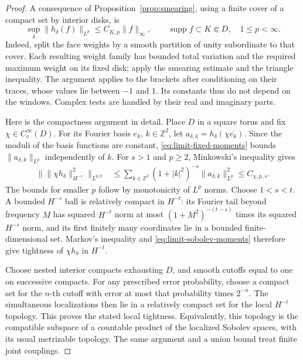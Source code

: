 \documentclass[11pt]{article}
\newcommand{\Z}{\mathbb Z}
\DeclareMathOperator{\supp}{supp}
\theoremstyle{definition}
\theoremstyle{remark}
\numberwithin{equation}{section}
\begin{document}
\begin{proof}
A consequence of Proposition~\ref{prop:smearing}, using a finite
cover of a compact set by interior disks, is
\begin{equation}
 \sup_\delta\|h_\delta(f)\|_{L^p}
 \le C_{K,p}\|f\|_\infty,\qquad
 \supp f\subset K\Subset D,\quad 1\le p<\infty.
 \label{eq:limit-fixed-moments}
\end{equation}
Indeed, split the face weights by a smooth partition of unity
subordinate to that cover.  Each resulting weight family has bounded
total variation and the required maximum weight on its fixed disk;
apply the smearing estimate and the triangle inequality.  The argument
applies to the brackets after conditioning on their traces, whose
values lie between \(-1\) and \(1\).  Its constants thus do not depend
on the windows.  Complex tests are handled by their real and imaginary
parts.

Here is the compactness argument in detail.  Place \(D\) in a square
torus and fix \(\chi\in C_c^\infty(D)\).  For its Fourier basis
\(e_k\), \(k\in\Z^2\), let
\(a_{\delta,k}=h_\delta(\chi\overline{e_k})\).  Since the moduli of the
basis functions are constant, \eqref{eq:limit-fixed-moments} bounds
\(\|a_{\delta,k}\|_{L^p}\) independently of \(k\).  For \(s>1\) and
\(p\ge2\), Minkowski's inequality gives
\begin{align}
 \bigl\|\|\chi h_\delta\|_{H^{-s}}^2\bigr\|_{L^{p/2}}
 &\le
 \sum_{k\in\Z^2}(1+|k|^2)^{-s}
             \|a_{\delta,k}\|_{L^p}^2
 \le C_{\chi,p,s}.
 \label{eq:limit-sobolev-moments}
\end{align}
The bounds for smaller \(p\) follow by monotonicity of \(L^p\) norms.
Choose \(1<s<t\).  A bounded \(H^{-s}\) ball is relatively compact
in \(H^{-t}\): its Fourier tail beyond frequency \(M\) has squared
\(H^{-t}\) norm at most
\((1+M^2)^{-(t-s)}\) times its squared \(H^{-s}\) norm, and its
first finitely many coordinates lie in a bounded finite-dimensional
set.  Markov's inequality and \eqref{eq:limit-sobolev-moments}
therefore give tightness of \(\chi h_\delta\) in \(H^{-t}\).

Choose nested interior compacts exhausting \(D\), and smooth cutoffs
equal to one on successive compacts.  For any prescribed error
probability, choose a compact set for the \(n\)-th cutoff with error
at most that probability times \(2^{-n}\).  The simultaneous
localizations then lie in a relatively compact set for the local
\(H^{-t}\) topology.  This proves the stated local tightness.
Equivalently, this topology is the compatible subspace of a countable
product of the localized Sobolev spaces, with its usual metrizable
topology.  The same argument and a union bound treat finite joint
couplings.


\end{proof}
\end{document}
